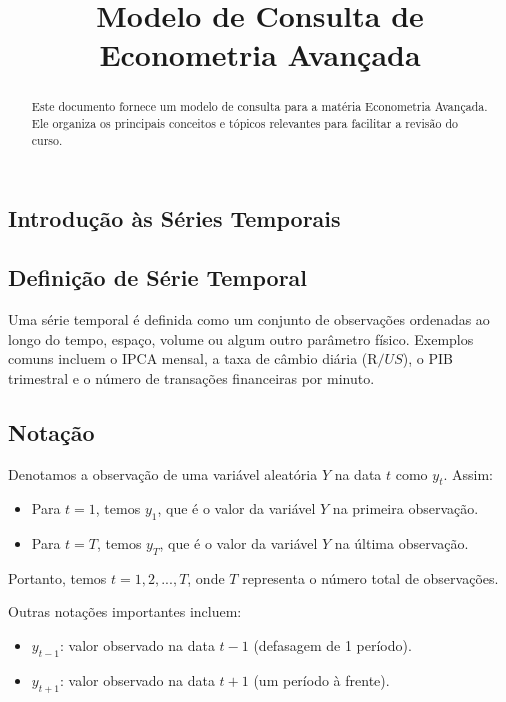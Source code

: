 \documentclass{sciposter}
\title{Modelo de Consulta de Econometria Avançada}
\institute 
{Bacharelado em Economia\\
Insper - Instituto de Ensino e Pesquisa\\
São Paulo, Brasil}
\begin{document}

\maketitle

\begin{multicols}{3}

\begin{abstract}
Este documento fornece um modelo de consulta para a matéria Econometria Avançada. Ele organiza os principais conceitos e tópicos relevantes para facilitar a revisão do curso.
\end{abstract}

\section{\textbf{Introdução às Séries Temporais}}

\subsection{Definição de Série Temporal}

Uma série temporal é definida como um conjunto de observações ordenadas ao longo do tempo, espaço, volume ou algum outro parâmetro físico. Exemplos comuns incluem o IPCA mensal, a taxa de câmbio diária (R$/US$), o PIB trimestral e o número de transações financeiras por minuto.

\subsection{Notação}
Denotamos a observação de uma variável aleatória $Y$ na data $t$ como $y_t$. Assim:
\begin{itemize}
    \item Para $t = 1$, temos $y_1$, que é o valor da variável $Y$ na primeira observação.
    \item Para $t = T$, temos $y_T$, que é o valor da variável $Y$ na última observação.
\end{itemize}
Portanto, temos $t = 1, 2, ..., T$, onde $T$ representa o número total de observações. 

Outras notações importantes incluem:
\begin{itemize}
    \item $y_{t-1}$: valor observado na data $t-1$ (defasagem de 1 período).
    \item $y_{t+1}$: valor observado na data $t+1$ (um período à frente).
\end{itemize}


\end{multicols}
\end{document}
